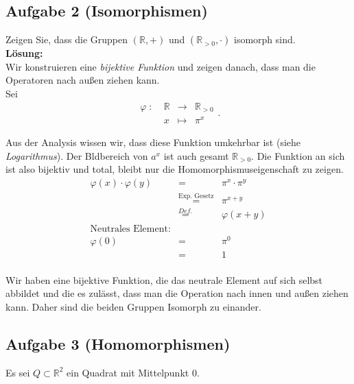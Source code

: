 \documentclass[11pt,a4paper,ngerman]{article}
\newcommand{\R}{\mathbb{R}}
\begin{document}
\pagebreak


\subsection*{Aufgabe 2 \mdseries (Isomorphismen)}

Zeigen Sie, dass die Gruppen $(\R,+)$ und $(\R_{>0},\cdot)$ isomorph sind.\\

\textbf{Lösung:}\\
Wir konstruieren eine \emph{bijektive Funktion} und zeigen danach, dass man die Operatoren nach außen ziehen kann.\\
Sei 
$$
\begin{array}{lrcl}
\varphi \; : \; & \R & \longrightarrow & \R_{>0}\\
& x & \longmapsto & \pi^x
\end{array}.
$$

Aus der Analysis wissen wir, dass diese Funktion umkehrbar ist (siehe \emph{Logarithmus}). Der Bldbereich von $a^x$ ist auch gesamt $\R_{>0}$. Die Funktion an sich ist also bijektiv und total, bleibt nur die Homomorphismuseigenschaft zu zeigen.
$$
\begin{array}{rcl}
\varphi (x) \cdot \varphi (y) &=& \pi^{x} \cdot \pi^{y}\\
	&\stackrel{\text{Exp. Gesetz}}{=}& \pi^{x + y}\\
	&\stackrel{Def.}{=}& \varphi(x+y)\\
\text{Neutrales Element:}&&\\
\varphi (0) &=& \pi^0\\
	&=& 1\\
\end{array}
$$

Wir haben eine bijektive Funktion, die das neutrale Element auf sich selbst abbildet und die es zulässt, dass man die Operation nach innen und außen ziehen kann. Daher sind die beiden Gruppen Isomorph zu einander.

\subsection*{Aufgabe 3 \mdseries (Homomorphismen)}
Es sei $Q \subset \R^2$ ein Quadrat mit Mittelpunkt 0.\\
\end{document}
